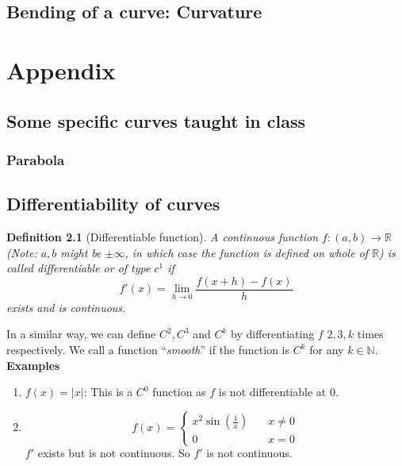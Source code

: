 \documentclass[oneside]{book}\twocolumn
\newtheorem{definition}[theorem]{Definition}
\begin{document}
\section{Bending of a curve: Curvature}
















































\chapter{Appendix}
\section{Some specific curves taught in class}
\subsection{Parabola}




\section{Differentiability of curves}
\begin{definition}[Differentiable function]
A continuous function $f:(a,b)\to\mathbb R$(\textit{Note:} $a,b$ might be $\pm \infty$, in which case the function is defined on whole of $\mathbb R$) is called differentiable or of type $c^1$ if $$f'(x)=\lim_{h\to 0}\frac{f(x+h)-f(x)}{h}$$
exists and is continuous.
\end{definition}
In a similar way, we can define $C^2,C^3$ and  $C^k$ by differentiating $f$ $2,3,k$ times respectively. We call a function ``\textit{smooth}'' if the function is $C^k$ for any $k\in\mathbb N$.\\
\textbf{Examples}
\begin{enumerate}
    \item $f(x)=|x|$: This is a $C^0$ function as $f$ is not differentiable at 0.
    \item $$f(x)=\begin{cases}x^2\sin\left(\frac{1}{x}\right)\quad&x\ne0\\
    0\quad&x=0
    \end{cases}$$
    $f'$ exists but is not continuous. So $f'$ is not continuous. 
\end{enumerate}
\end{document}
